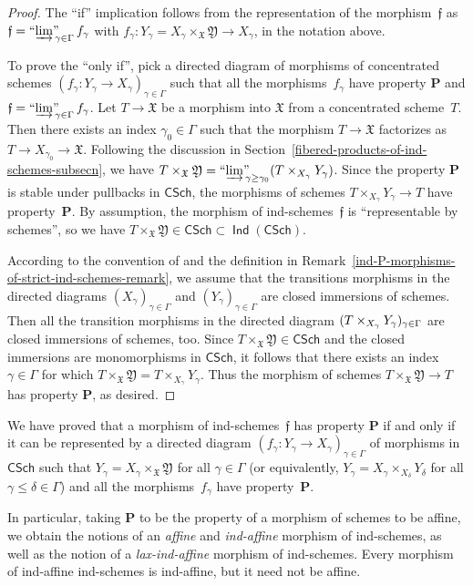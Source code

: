 \documentclass[12pt,a4paper]{amsart}
\newcommand{\+}{\protect\nobreakdash-}
\renewcommand{\:}{\colon}
\newcommand{\rarrow}{\longrightarrow}
\DeclareMathOperator{\Ind}{\mathsf{Ind}}
\newcommand{\CSch}{\mathsf{CSch}}
\newcommand{\ilim}
 {\mathop{\text{\normalfont``$\varinjlim$''\!\!}}\nolimits}
\newcommand{\bP}{\mathbf P}
\newcommand{\fX}{\mathfrak X}
\newcommand{\fY}{\mathfrak Y}
\newcommand{\ff}{\mathfrak f}
\theoremstyle{plain}
\theoremstyle{definition}
\begin{document}
\begin{proof}
 The ``if'' implication follows from the representation of
the morphism~$\ff$ as $\ff=\ilim_{\gamma\in\Gamma}f_\gamma$ with
$f_\gamma\:Y_\gamma=X_\gamma\times_\fX\fY\rarrow X_\gamma$, in
the notation above.

 To prove the ``only if'', pick a directed diagram of morphisms of
concentrated schemes $(f_\gamma\:Y_\gamma\to
X_\gamma)_{\gamma\in\Gamma}$ such that all the morphisms~$f_\gamma$
have property $\bP$ and $\ff=\ilim_{\gamma\in\Gamma}f_\gamma$.
 Let $T\rarrow\fX$ be a morphism into $\fX$ from a concentrated
scheme~$T$.
 Then there exists an index $\gamma_0\in\Gamma$ such that
the morphism $T\rarrow\fX$ factorizes as $T\rarrow X_{\gamma_0}
\rarrow\fX$.
 Following the discussion in
Section~\ref{fibered-products-of-ind-schemes-subsecn}, we have
$T\times_\fX\fY=\ilim_{\gamma\ge\gamma_0}
(T\times_{X_\gamma}\nobreak Y_\gamma)$.
 Since the property $\bP$ is stable under pullbacks in $\CSch$,
the morphisms of schemes $T\times_{X_\gamma}Y_\gamma\rarrow T$ have
property~$\bP$.
 By assumption, the morphism of ind-schemes~$\ff$ is ``representable
by schemes'', so we have $T\times_\fX\fY\in\CSch\subset\Ind(\CSch)$.

 According to the convention of and the definition in
Remark~\ref{ind-P-morphisms-of-strict-ind-schemes-remark}, we assume
that the transitions morphisms in the directed diagrams
$(X_\gamma)_{\gamma\in\Gamma}$ and $(Y_\gamma)_{\gamma\in\Gamma}$
are closed immersions of schemes.
 Then all the transition morphisms in the directed diagram
$(T\times_{X_\gamma}\nobreak Y_\gamma)_{\gamma\in\Gamma}$ are
closed immersions of schemes, too.
 Since $T\times_\fX\fY\in\CSch$ and the closed immersions are
monomorphisms in $\CSch$, it follows that there exists an index
$\gamma\in\Gamma$ for which $T\times_\fX\fY=
T\times_{X_\gamma}Y_\gamma$.
 Thus the morphism of schemes $T\times_\fX\fY\rarrow T$ has
property $\bP$, as desired.
\end{proof}

 We have proved that a morphism of ind-schemes~$\ff$ has property $\bP$
if and only if it can be represented by a directed diagram
$(f_\gamma\:Y_\gamma\to X_\gamma)_{\gamma\in\Gamma}$ of morphisms in
$\CSch$ such that $Y_\gamma=X_\gamma\times_\fX\fY$ for all
$\gamma\in\Gamma$ (or equivalently, $Y_\gamma=X_\gamma\times_{X_\delta}
Y_\delta$ for all $\gamma\le\delta\in\Gamma$) and all the
morphisms~$f_\gamma$ have property~$\bP$.

 In particular, taking $\bP$ to be the property of a morphism of
schemes to be affine, we obtain the notions of an \emph{affine}
and \emph{ind-affine} morphism of ind-schemes, as well as the notion
of a \emph{lax-ind-affine} morphism of ind-schemes.
 Every morphism of ind-affine ind-schemes is ind-affine, but it need
not be affine.
\end{document}
